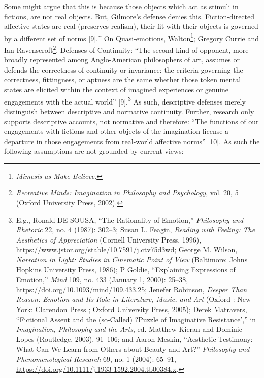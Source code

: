 \documentclass[phdthesis,12pt,final,a4paper]{wuthesis}
\theoremstyle{definition}
\theoremstyle{definition}
\theoremstyle{definition}
\theoremstyle{definition}
\theoremstyle{remark}
\begin{document}
Some might argue that this is because those objects which act as stimuli in fictions, are not real objects. But, Gilmore's defense denies this. Fiction-directed affective states are real (preserves realism), their fit with their objects is governed by a different set of norms {[}9{]}.\^{}{[}On Quasi-emotions, Walton\footnote{\emph{Mimesis as {Make-Believe}}.}; Gregory Currie and Ian Ravenscroft\footnote{\emph{Recreative Minds: Imagination in Philosophy and Psychology}, vol. 20, 5 (Oxford University Press, 2002).}. Defenses of Continuity: ``The second kind of opponent, more broadly represented among Anglo-American philosophers of art, assumes or defends the correctness of continuity or invariance: the criteria governing the correctness, fittingness, or aptness are the same whether those token mental states are elicited within the context of imagined experiences or genuine engagements with the actual world'' {[}9{]}.\footnote{E.g., Ronald DE SOUSA, {``The {Rationality} of {Emotion},''} \emph{Philosophy and Rhetoric} 22, no. 4 (1987): 302--3; Susan L. Feagin, \emph{Reading with {Feeling}: {The Aesthetics} of {Appreciation}} (Cornell University Press, 1996), \url{https://www.jstor.org/stable/10.7591/j.ctv75d3wd}; George M. Wilson, \emph{Narration in Light: Studies in Cinematic Point of View} (Baltimore: Johns Hopkins University Press, 1986); P Goldie, {``Explaining Expressions of Emotion,''} \emph{Mind} 109, no. 433 (January 1, 2000): 25--38, \url{https://doi.org/10.1093/mind/109.433.25}; Jenefer Robinson, \emph{Deeper Than Reason: Emotion and Its Role in Literature, Music, and Art} (Oxford : New York: Clarendon Press ; Oxford University Press, 2005); Derek Matravers, {``Fictional {Assent} and the (so-{Called}) ?{Puzzle} of {Imaginative Resistance}',''} in \emph{Imagination, {Philosophy} and the {Arts}}, ed. Matthew Kieran and Dominic Lopes (Routledge, 2003), 91--106; and Aaron Meskin, {``Aesthetic {Testimony}: {What Can We Learn} from {Others} about {Beauty} and {Art}?''} \emph{Philosophy and Phenomenological Research} 69, no. 1 (2004): 65--91, \url{https://doi.org/10.1111/j.1933-1592.2004.tb00384.x}.} As such, descriptive defenses merely distinguish between descriptive and normative continuity. Further, research only supports descriptive accounts, not normative and therefore: ``The functions of our engagements with fictions and other objects of the imagination license a departure in those engagements from real-world affective norms'' {[}10{]}. As such the following assumptions are not grounded by current views:
\end{document}
